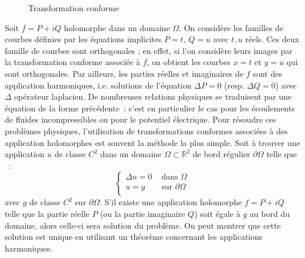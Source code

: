 \begin{figure}[h]
\caption{Transformation conforme}\label{Fi:fig2}
\end{figure}

Soit $f = P + i Q$ holomorphe dans un domaine $\Omega$. On considère
les familles de courbes définies par les équations implicites $P = t$,
$Q = u$ avec $t,u$ réels. Ces deux famille de courbes sont
orthogonales ; en effet, si l'on considère leurs images par la
transformation conforme associée à $f$, on obtient les courbes $x = t$
et $y = u$ qui sont orthogonales. Par ailleurs, les parties réelles et
imaginaires de $f$ sont des application harmoniques, i.e. solutions de
l'équation $\Delta P = 0$ (resp. $\Delta Q = 0$) avec $\Delta$
opérateur laplacien. De nombreuses relations physiques se traduisent
par une équation de la forme précédente~: c'est en particulier le cas
pour les écoulements de fluides incompressibles ou pour le potentiel
électrique. Pour résoudre ces problèmes physiques, l'utilisation de
transformations conformes associées à des application holomorphes est
souvent la méthode la plus simple. 
Soit à trouver une application $u$ de classe $C^2$ dans un domaine
$\Omega \subset \mathbb{R}^2$ de bord régulier $\partial \Omega$ telle que ~:
\[
\left \{
\begin{array}{cc}
\Delta u = 0 & \mbox{ dans } \Omega \\
u = g & \mbox{ sur } \partial \Omega \\
\end{array}
\right .
\] 
avec $g$ de classe $C^2$ sur $\partial \Omega$. S'il existe une
application holomorphe $f = P + i Q$ telle que la partie réelle $P$ (ou
la partie imaginaire $Q$) soit égale à $g$ au bord du domaine, alors celle-ci
sera solution du problème. On peut montrer que cette solution est unique en
utilisant un théorème concernant les applications harmoniques.

